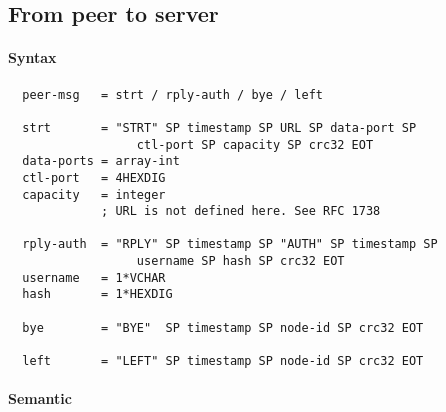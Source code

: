\documentclass{medusabook}
\begin{document}
\subsection{From peer to server}
\label{sub:1.3.0;medusa_book}

\paragraph{Syntax}
\label{subsub:1.3.0.0;medusa_book}

\begin{verbatim}
  peer-msg   = strt / rply-auth / bye / left

  strt       = "STRT" SP timestamp SP URL SP data-port SP
                  ctl-port SP capacity SP crc32 EOT
  data-ports = array-int
  ctl-port   = 4HEXDIG
  capacity   = integer
             ; URL is not defined here. See RFC 1738

  rply-auth  = "RPLY" SP timestamp SP "AUTH" SP timestamp SP
                  username SP hash SP crc32 EOT
  username   = 1*VCHAR
  hash       = 1*HEXDIG

  bye        = "BYE"  SP timestamp SP node-id SP crc32 EOT

  left       = "LEFT" SP timestamp SP node-id SP crc32 EOT
\end{verbatim}

\paragraph{Semantic}
\label{subsub:1.3.0.1;medusa_book}
\end{document}
